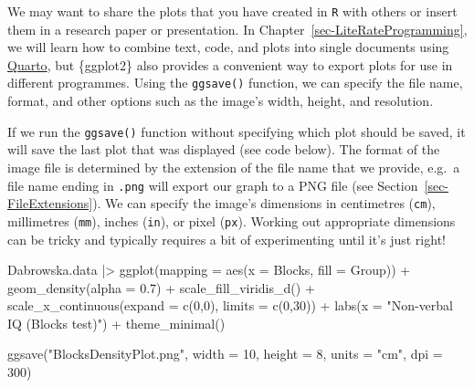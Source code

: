 \documentclass[
  letterpaper,
  DIV=11,
  numbers=noendperiod]{scrreprt}
\newenvironment{Shaded}{\begin{snugshade}}{\end{snugshade}}
\newcommand{\AttributeTok}[1]{\textcolor[rgb]{0.40,0.45,0.13}{#1}}
\newcommand{\DecValTok}[1]{\textcolor[rgb]{0.68,0.00,0.00}{#1}}
\newcommand{\FloatTok}[1]{\textcolor[rgb]{0.68,0.00,0.00}{#1}}
\newcommand{\FunctionTok}[1]{\textcolor[rgb]{0.28,0.35,0.67}{#1}}
\newcommand{\NormalTok}[1]{\textcolor[rgb]{0.00,0.23,0.31}{#1}}
\newcommand{\SpecialCharTok}[1]{\textcolor[rgb]{0.37,0.37,0.37}{#1}}
\newcommand{\StringTok}[1]{\textcolor[rgb]{0.13,0.47,0.30}{#1}}
\begin{document}
We may want to share the plots that you have created in \texttt{R} with
others or insert them in a research paper or presentation. In
Chapter~\ref{sec-LiteRateProgramming}, we will learn how to combine
text, code, and plots into single documents using
\hyperref[sec-StartQuarto]{Quarto}, but \{ggplot2\} also provides a
convenient way to export plots for use in different programmes. Using
the \texttt{ggsave()} function, we can specify the file name, format,
and other options such as the image's width, height, and resolution.

If we run the \texttt{ggsave()} function without specifying which plot
should be saved, it will save the last plot that was displayed (see code
below). The format of the image file is determined by the extension of
the file name that we provide, e.g.~a file name ending in \texttt{.png}
will export our graph to a PNG file (see
Section~\ref{sec-FileExtensions}). We can specify the image's dimensions
in centimetres (\texttt{cm}), millimetres (\texttt{mm}), inches
(\texttt{in}), or pixel (\texttt{px}). Working out appropriate
dimensions can be tricky and typically requires a bit of experimenting
until it's just right!

\begin{Shaded}
\begin{Highlighting}[]
\NormalTok{Dabrowska.data }\SpecialCharTok{|\textgreater{}} 
  \FunctionTok{ggplot}\NormalTok{(}\AttributeTok{mapping =} \FunctionTok{aes}\NormalTok{(}\AttributeTok{x =}\NormalTok{ Blocks,}
                       \AttributeTok{fill =}\NormalTok{ Group)) }\SpecialCharTok{+}
  \FunctionTok{geom\_density}\NormalTok{(}\AttributeTok{alpha =} \FloatTok{0.7}\NormalTok{) }\SpecialCharTok{+}
  \FunctionTok{scale\_fill\_viridis\_d}\NormalTok{() }\SpecialCharTok{+}
  \FunctionTok{scale\_x\_continuous}\NormalTok{(}\AttributeTok{expand =} \FunctionTok{c}\NormalTok{(}\DecValTok{0}\NormalTok{,}\DecValTok{0}\NormalTok{),}
                     \AttributeTok{limits =} \FunctionTok{c}\NormalTok{(}\DecValTok{0}\NormalTok{,}\DecValTok{30}\NormalTok{)) }\SpecialCharTok{+}
  \FunctionTok{labs}\NormalTok{(}\AttributeTok{x =} \StringTok{"Non{-}verbal IQ (Blocks test)"}\NormalTok{) }\SpecialCharTok{+}
  \FunctionTok{theme\_minimal}\NormalTok{()}

\FunctionTok{ggsave}\NormalTok{(}\StringTok{"BlocksDensityPlot.png"}\NormalTok{,}
       \AttributeTok{width =} \DecValTok{10}\NormalTok{,}
       \AttributeTok{height =} \DecValTok{8}\NormalTok{,}
       \AttributeTok{units =} \StringTok{"cm"}\NormalTok{,}
       \AttributeTok{dpi =} \DecValTok{300}\NormalTok{)}
\end{Highlighting}
\end{Shaded}
\end{document}
